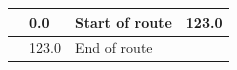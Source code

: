 \documentclass[11pt]{article}
\begin{document}
\renewcommand{\arraystretch}{1.15}
\twocolumn
{}
\tabletail{\hline}
\tablelasttail{\hline}
\begin{center}
  \begin{supertabular}{|c|p{0.30in}|p{2.25in}|l|}
  \hline
{} \textbf{} &   0.0 & Start of route & 123.0 \\ \hline
{} \textbf{} & 123.0 & End of route &  \\ \hline

\end{supertabular}
\end{center}
\end{document}
